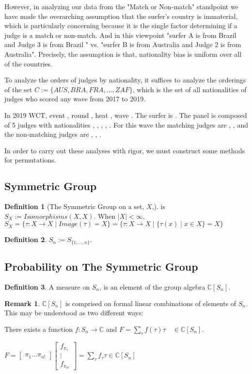 \documentclass{article}
\theoremstyle{definition}
\newtheorem{definition}{Definition}
\newtheorem*{remark}{Remark}
\begin{document}
However, in analyzing our data from the "Match or Non-match" standpoint we have made the overarching assumption that the  surfer's country is immaterial, which is particularly concerning because it is the single factor determining if a judge is a match or non-match. And in this viewpoint "surfer A is from Brazil and Judge 3 is from Brazil " vs. "surfer B is from Australia and Judge 2 is from Australia". Precisely, the assumption is that, nationality bias is uniform over all of the countries. 

To analyze the orders of judges by nationality, it suffices to analyze the orderings of the set $C := \{AUS, BRA, FRA, \dots, ZAF\}$, which is the set of all nationalities of judges who scored any wave from 2017 to 2019.

In 2019 WCT, event      , round     , heat   , wave    . The surfer is     . The panel is composed of 5 judges with nationalities {  ,  ,  ,  ,  }. For this wave the matching judges are { , }, and the non-matching judges are { , , }.

In order to carry out these analyses with rigor, we must construct some methods for permutations.

\subsection{Symmetric Group}
\begin{definition}[The Symmetric Group on a set, $X$,] is $S_X := Isomorphisms(X,X)$. When $|X|<\infty$, $S_X = \{ \tau :X\rightarrow X \mid Image(\tau) = X \}  = \{\tau:X\rightarrow X \mid \{\tau(x) \mid x \in X\} = X \} $
\end{definition}
\begin{definition} $S_n := S_{\{ 1 ,\dots, n\}}. $\end{definition}

\subsection{Probability on The Symmetric Group}

\begin{definition} A measure on $S_n$, is an element of the group algebra $\mathbb{C}[S_n]$.\end{definition}
\begin{remark} $\mathbb{C}[S_n]$ is comprised on formal linear combinations of elements of $S_n$. This may be understood as two different ways:
\item There exists a function $ f:S_n \rightarrow \mathbb{C}$ and $F =  \sum_{\tau} f(\tau) \tau \quad \in \mathbb{C}[S_n]$.
\item $ F = \begin{bmatrix} \pi_1 \dots \pi_{n!} \end{bmatrix}\begin{bmatrix}  f_{\pi_1} \\ \vdots \\ f_{\pi_{n!} }\end{bmatrix} = \sum_{\tau} f_\tau \tau \in \mathbb{C}[S_n]$
\end{remark}
\end{document}
